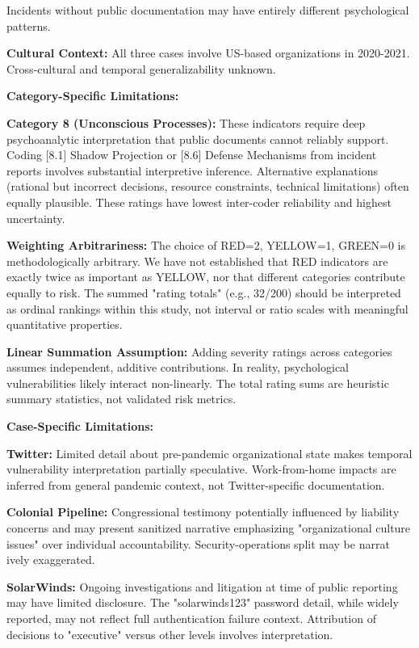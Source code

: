 \documentclass[11pt,a4paper]{article}
\begin{document}
Incidents without public documentation may have entirely different psychological patterns.

\textbf{Cultural Context:} All three cases involve US-based organizations in 2020-2021. Cross-cultural and temporal generalizability unknown.

\textbf{Category-Specific Limitations:}

\textbf{Category 8 (Unconscious Processes):} These indicators require deep psychoanalytic interpretation that public documents cannot reliably support. Coding [8.1] Shadow Projection or [8.6] Defense Mechanisms from incident reports involves substantial interpretive inference. Alternative explanations (rational but incorrect decisions, resource constraints, technical limitations) often equally plausible. These ratings have lowest inter-coder reliability and highest uncertainty.

\textbf{Weighting Arbitrariness:} The choice of RED=2, YELLOW=1, GREEN=0 is methodologically arbitrary. We have not established that RED indicators are exactly twice as important as YELLOW, nor that different categories contribute equally to risk. The summed "rating totals" (e.g., 32/200) should be interpreted as ordinal rankings within this study, not interval or ratio scales with meaningful quantitative properties.

\textbf{Linear Summation Assumption:} Adding severity ratings across categories assumes independent, additive contributions. In reality, psychological vulnerabilities likely interact non-linearly. The total rating sums are heuristic summary statistics, not validated risk metrics.

\textbf{Case-Specific Limitations:}

\textbf{Twitter:} Limited detail about pre-pandemic organizational state makes temporal vulnerability interpretation partially speculative. Work-from-home impacts are inferred from general pandemic context, not Twitter-specific documentation.

\textbf{Colonial Pipeline:} Congressional testimony potentially influenced by liability concerns and may present sanitized narrative emphasizing "organizational culture issues" over individual accountability. Security-operations split may be narrat ively exaggerated.

\textbf{SolarWinds:} Ongoing investigations and litigation at time of public reporting may have limited disclosure. The "solarwinds123" password detail, while widely reported, may not reflect full authentication failure context. Attribution of decisions to "executive" versus other levels involves interpretation.
\end{document}
